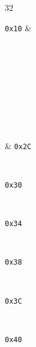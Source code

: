 \begin{bytefield}[
	leftcurly=.,
	leftcurlyspace=0pt,
	bitformatting={\small\ttfamily},
	boxformatting={\centering\small},
	endianness=big]{32}
	\begin{leftwordgroup}{\texttt{0x10} & \\ \\ \\ \\ \\ \\ \\ \\ \\ \\ & \texttt{0x2C}}
	\end{leftwordgroup} \\
	\begin{leftwordgroup}{\texttt{0x30}}
	\end{leftwordgroup} \\
	\begin{leftwordgroup}{\texttt{0x34}}
	\end{leftwordgroup} \\
	\begin{leftwordgroup}{\texttt{0x38}}
	\end{leftwordgroup} \\
	\begin{leftwordgroup}{\texttt{0x3C}}
	\end{leftwordgroup} \\
	\begin{leftwordgroup}{\texttt{0x40}}
	\end{leftwordgroup}
\end{bytefield}
